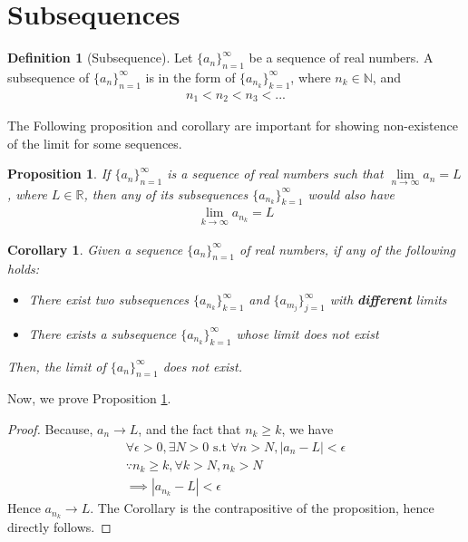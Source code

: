 \documentclass[12pt]{book}
\newtheorem{prop}{Proposition}
\newtheorem{corollary}{Corollary}
\theoremstyle{definition}
\newtheorem{definition}{Definition}[section]
\begin{document}


\section{Subsequences}

\begin{definition}[Subsequence]
	Let $\{a_n\}_{n=1}^{\infty}$ be a sequence of real numbers. A subsequence of $\{a_n\}_{n=1}^{\infty}$ is in the form of $\{a_{n_k}\}_{k=1}^{\infty}$, where $n_k \in \mathbb{N}$, and 
	\begin{align*}
	n_1<n_2<n_3< ...	
	\end{align*}

\end{definition}

\noindent
The Following proposition and corollary are important for showing non-existence of the limit for some sequences.
\begin{prop}
\label{seq_subseq_prop}
	If $\{a_n\}_{n=1}^{\infty}$ is a sequence of real numbers such that $\lim\limits_{n \to \infty}a_n =L$, where $L \in \mathbb{R}$, then any of its subsequences $\{a_{n_k}\}_{k=1}^{\infty}$ would also have
	\begin{align*}
	\lim_{k\to \infty} a_{n_k} = L	
	\end{align*}
\end{prop} 
\begin{corollary}
	Given a sequence $\{a_n\}_{n=1}^{\infty}$ of real numbers, if any of the following holds:
	\begin{itemize}
		\item There exist two subsequences $\{a_{n_k}\}_{k=1}^{\infty}$ and $\{a_{m_j}\}_{j=1}^{\infty}$ with \textbf{different} limits 
		\item There exists a subsequence $\{a_{n_k}\}_{k=1}^{\infty}$ whose limit does not exist
	\end{itemize}
	Then, the limit of $\{a_n\}_{n=1}^{\infty}$ does not exist.
\end{corollary}
\noindent
Now, we prove Proposition \ref{seq_subseq_prop}.
\begin{proof}
Because, $a_n \to L$, and the fact that $n_k \geq k$, we have
\begin{align*}
\forall \epsilon >0, \exists N>0 \text{ s.t } \forall n >N, |a_n - L| < \epsilon\\
\because n_k \geq k, \forall k > N,  n_k > N\\
\implies |a_{n_k} - L| <\epsilon     	
\end{align*}
Hence $a_{n_k} \to L$. The Corollary is the contrapositive of the proposition, hence directly follows. 


\end{proof} 
\end{document}
